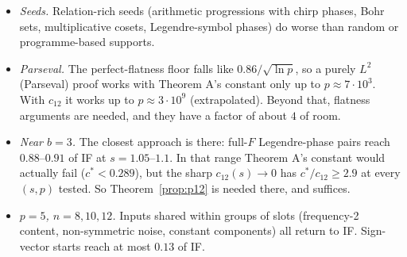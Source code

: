 \documentclass[11pt]{article}
\theoremstyle{definition}
\begin{document}
\begin{itemize}
\begin{itemize}
\item \emph{Seeds.}  Relation-rich seeds (arithmetic progressions with chirp phases, Bohr sets, multiplicative cosets, Legendre-symbol phases) do worse than
random or programme-based supports.
\item \emph{Parseval.}  The perfect-flatness floor falls like $0.86/\sqrt{\ln p}$, so a purely $L^2$ (Parseval) proof works with Theorem A's constant only up to
$p\approx7\cdot10^3$.  With $c_{12}$ it works up to $p\approx3\cdot10^9$ (extrapolated).  Beyond that, flatness arguments are needed, and they have a factor of about $4$ of room.
\item \emph{Near $b=3$.}  The closest approach is there: full-$F$ Legendre-phase pairs reach $0.88$--$0.91$ of IF at $s=1.05$--$1.1$.  In that range Theorem A's constant
would actually fail ($c^*<0.289$), but the sharp $c_{12}(s)\to0$ has $c^*/c_{12}\ge2.9$ at every $(s,p)$ tested.  So Theorem~\ref{prop:p12} is needed there, and suffices.
\item \emph{$p=5$, $n=8,10,12$.}  Inputs shared within groups of slots (frequency-2 content, non-symmetric noise, constant components) all return to IF.  Sign-vector
starts reach at most $0.13$ of IF.
\end{itemize}
\end{itemize}
\end{document}
